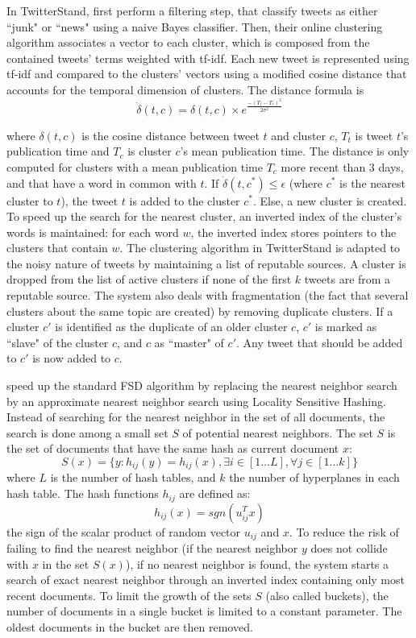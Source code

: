 In TwitterStand, \citet{sankaranarayanan_twitterstand:_2009} first perform a filtering step, that classify tweets as either ``junk" or ``news" using a naive Bayes classifier. Then, their online clustering algorithm associates a vector to each cluster, which is composed from the contained tweets' terms weighted with tf-idf. Each new tweet is represented using tf-idf and compared to the clusters' vectors using a modified cosine distance that accounts for the temporal dimension of clusters. The distance formula is 
$$
\dot{\delta}(t,c) = \delta(t,c)\times e^{\frac{-(T_t-T_c)^2}{2\sigma^2}}
$$

\noindent where $\delta(t,c)$ is the cosine distance between tweet $t$ and cluster $c$, $T_t$ is tweet $t$'s publication time and $T_c$ is cluster $c$'s mean publication time. The distance is only computed for clusters with a mean publication time $T_c$ more recent than 3 days, and that have a word in common with $t$. If $\dot{\delta}(t,c^*) \leqslant \epsilon$ (where $c^*$ is the nearest cluster to $t$), the tweet $t$ is added to the cluster $c^*$. Else, a new cluster is created. To speed up the search for the nearest cluster, an inverted index of the cluster's words is maintained: for each word $w$, the inverted index stores pointers to the clusters that contain $w$. The clustering algorithm in TwitterStand is adapted to the noisy nature of tweets by maintaining a list of reputable sources. A cluster is dropped from the list of active clusters if none of the first $k$ tweets are from a reputable source. The system also deals with fragmentation (the fact that several clusters about the same topic are created) by removing duplicate clusters. If a cluster $c'$  is identified as the duplicate of an older cluster $c$, $c'$ is marked as ``slave" of the cluster $c$, and $c$ as ``master" of $c'$. Any tweet that should be added to $c'$ is now added to $c$.

\citet{petrovic_streaming_2010} speed up the standard FSD algorithm by replacing the nearest neighbor search by an approximate nearest neighbor search using Locality Sensitive Hashing. Instead of searching for the nearest neighbor in the set of all documents, the search is done among a small set $S$ of potential nearest neighbors. The set $S$ is the set of documents that have the same hash as current document $x$:
$$
S(x) = \{y: h_{ij}(y) = h_{ij}(x), \exists i \in [1 \ldots L], \forall j \in [1 \ldots k]\}
$$
where $L$ is the number of hash tables, and $k$ the number of hyperplanes in each hash table. The hash functions $h_{ij}$ are defined as:
$$
h_{ij}(x) = sgn(u_{ij}^Tx)
$$
the sign of the scalar product of random vector $u_{ij}$ and $x$. To reduce the risk of failing to find the nearest neighbor (if the nearest neighbor $y$ does not collide with $x$ in the set $S(x)$), if no nearest neighbor is found, the system starts a search of exact nearest neighbor through an inverted index containing only most recent documents. To limit the growth of the sets $S$ (also called buckets), the number of documents in a single bucket is limited to a constant parameter. The oldest documents in the bucket are then removed. 

